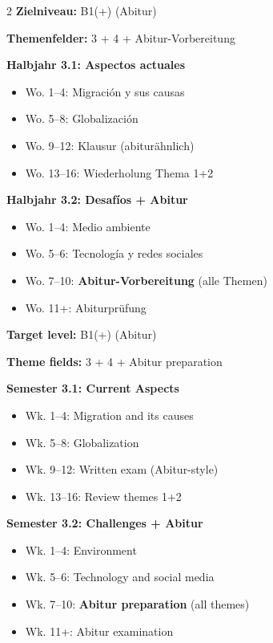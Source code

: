 \documentclass[10pt,a4paper]{article}
\begin{document}
\begin{paracol}{2}
\small
\textbf{Zielniveau:} B1(+) (Abitur)\footnotemark[7]
\par\vspace{1mm}
\textbf{Themenfelder:} 3 + 4 + Abitur-Vorbereitung

\textbf{Halbjahr 3.1: Aspectos actuales}
\begin{itemize}[noitemsep,topsep=2pt]
\item Wo. 1--4: Migración y sus causas
\item Wo. 5--8: Globalización
\item Wo. 9--12: Klausur (abiturähnlich)
\item Wo. 13--16: Wiederholung Thema 1+2
\end{itemize}

\textbf{Halbjahr 3.2: Desafíos + Abitur}
\begin{itemize}[noitemsep,topsep=2pt]
\item Wo. 1--4: Medio ambiente
\item Wo. 5--6: Tecnología y redes sociales
\item Wo. 7--10: \textbf{Abitur-Vorbereitung} (alle Themen)
\item Wo. 11+: Abiturprüfung
\end{itemize}

\switchcolumn

\small\color{english}
\textbf{Target level:} B1(+) (Abitur)\footnotemark[7]
\par\vspace{1mm}
\textbf{Theme fields:} 3 + 4 + Abitur preparation

\textbf{Semester 3.1: Current Aspects}
\begin{itemize}[noitemsep,topsep=2pt]
\item Wk. 1--4: Migration and its causes
\item Wk. 5--8: Globalization
\item Wk. 9--12: Written exam (Abitur-style)
\item Wk. 13--16: Review themes 1+2
\end{itemize}

\textbf{Semester 3.2: Challenges + Abitur}
\begin{itemize}[noitemsep,topsep=2pt]
\item Wk. 1--4: Environment
\item Wk. 5--6: Technology and social media
\item Wk. 7--10: \textbf{Abitur preparation} (all themes)
\item Wk. 11+: Abitur examination
\end{itemize}

\end{paracol}
\end{document}
